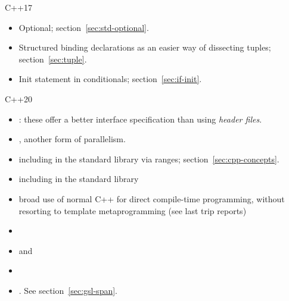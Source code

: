 
 {C++17}

\begin{itemize}
\item  Optional; section~\ref{sec:std-optional}.
\item Structured binding declarations as an easier way of dissecting
  tuples; section~\ref{sec:tuple}.
\item Init statement in conditionals; section~\ref{sec:if-init}.
\end{itemize}


 {C++20}


\begin{itemize}
\item   {}: these offer a better interface
  specification than using
  \emph{header files}.
\item   {}, another form of parallelism.
\item   {} including in the standard library via
  ranges; section~\ref{sec:cpp-concepts}.
\item   {} including in the standard library
\item   broad use of normal C++ for direct compile-time programming, without
  resorting to template metaprogramming (see last trip reports)
\item {}
\item   {} and 
\item   {}
\item {}. See section~\ref{sec:gsl-span}.
\end{itemize}
